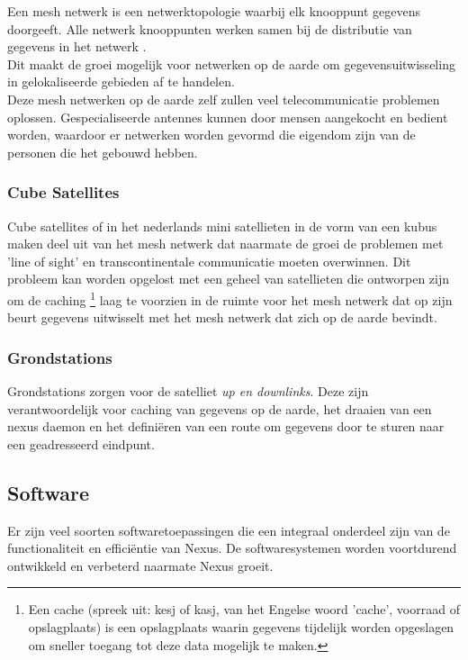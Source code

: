\documentclass[11pt]{article}
\begin{document}
Een mesh netwerk is een netwerktopologie waarbij elk knooppunt gegevens doorgeeft. Alle netwerk knooppunten werken samen bij de distributie van gegevens in het netwerk \cite{meshnetworks}.\\ 

\noindent 
Dit maakt de groei mogelijk voor netwerken op de aarde om gegevensuitwisseling in gelokaliseerde gebieden af ​​te handelen.\\

\noindent Deze mesh netwerken op de aarde zelf zullen veel telecommunicatie problemen oplossen. Gespecialiseerde antennes kunnen door mensen aangekocht en bedient worden, waardoor er netwerken worden gevormd die eigendom zijn van de personen die het gebouwd hebben.

\subsubsection{Cube Satellites}

Cube satellites of in het nederlands mini satellieten in de vorm van een kubus maken deel uit van het mesh netwerk dat naarmate de groei de problemen met 'line of sight' en transcontinentale communicatie moeten overwinnen. Dit probleem kan worden opgelost met een geheel van satellieten die ontworpen zijn om de caching \footnote{Een cache (spreek uit: kesj of kasj, van het Engelse woord 'cache', voorraad of opslagplaats) is een opslagplaats waarin gegevens tijdelijk worden opgeslagen om sneller toegang tot deze data mogelijk te maken.\cite{caching}} laag te voorzien in de ruimte voor het mesh netwerk dat op zijn beurt gegevens uitwisselt met het mesh netwerk dat zich op de aarde bevindt.

\subsubsection{Grondstations}

Grondstations zorgen voor de satelliet \textit{up en downlinks}. 
Deze zijn verantwoordelijk voor caching van gegevens op de aarde, het draaien van een nexus daemon en het defini\"eren van een route om gegevens door te sturen naar een geadresseerd eindpunt.

\subsection{Software}

Er zijn veel soorten softwaretoepassingen die een integraal onderdeel zijn van de functionaliteit en effici\"entie van Nexus. De softwaresystemen worden voortdurend ontwikkeld en verbeterd naarmate Nexus groeit.
\end{document}
